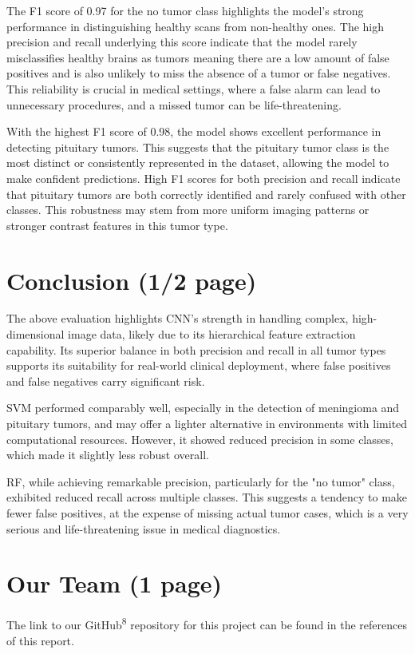 \documentclass[conference]{IEEEtran}
\begin{document}
The F1 score of 0.97 for the no tumor class highlights the model’s strong performance in distinguishing healthy scans from non-healthy ones. The high precision and recall underlying this score indicate that the model rarely misclassifies healthy brains as tumors meaning there are a low amount of false positives and is also unlikely to miss the absence of a tumor or false negatives. This reliability is crucial in medical settings, where a false alarm can lead to unnecessary procedures, and a missed tumor can be life-threatening.

With the highest F1 score of 0.98, the model shows excellent performance in detecting pituitary tumors. This suggests that the pituitary tumor class is the most distinct or consistently represented in the dataset, allowing the model to make confident predictions. High F1 scores for both precision and recall indicate that pituitary tumors are both correctly identified and rarely confused with other classes. This robustness may stem from more uniform imaging patterns or stronger contrast features in this tumor type.

\section{\large Conclusion (1/2 page)}
The above evaluation highlights CNN's strength in handling complex, high-dimensional image data, likely due to its hierarchical feature extraction capability. Its superior balance in both precision and recall in all tumor types supports its suitability for real-world clinical deployment, where false positives and false negatives carry significant risk.

SVM performed comparably well, especially in the detection of meningioma and pituitary tumors, and may offer a lighter alternative in environments with limited computational resources. However, it showed reduced precision in some classes, which made it slightly less robust overall.

RF, while achieving remarkable precision, particularly for the "no tumor" class, exhibited reduced recall across multiple classes. This suggests a tendency to make fewer false positives, at the expense of missing actual tumor cases, which is a very serious and life-threatening issue in medical diagnostics.

\section{\large Our Team (1 page)}
The link to our GitHub\textsuperscript{8} repository for this project can be found in the references of this report.
\end{document}
